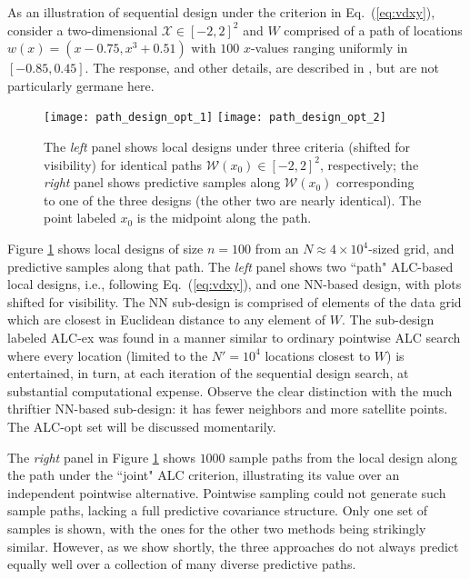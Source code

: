 \documentclass[12pt]{article}
\begin{document}
As an illustration of sequential design under the criterion in
Eq.~(\ref{eq:vdxy}), consider a two-dimensional $\mathcal{X} \in [-2,2]^2$ and $W$
comprised of a path of locations $w(x) = (x-0.75, x^3 + 0.51)$ with $100$
$x$-values ranging uniformly in $[-0.85, 0.45]$.  The response, and other
details, are described in \citet[][Section 3.4]{gramacy:apley:2015}, but are
not particularly germane here.  
\begin{figure}[ht!]
\centering
\texttt{[image: path\_design\_opt\_1]}\hspace{0.1cm}
\texttt{[image: path\_design\_opt\_2]}\vspace{-0.4cm}
\caption{
The {\em left} panel shows local designs under three criteria (shifted for
visibility) for identical paths $\mathcal{W}(x_0) \in [-2, 2]^2$,
respectively; the {\em right} panel shows predictive samples along
$\mathcal{W}(x_0)$ corresponding to one of the three designs (the other two
are nearly identical).  The point labeled $x_0$ is the midpoint along the
path.}
\label{f:path_design_opt}
\end{figure}
Figure \ref{f:path_design_opt} shows local designs of size $n=100$ from an
$N \approx 4 \times 10^4$-sized grid, and predictive samples along that path. The {\em
left} panel shows two ``path" ALC-based local designs, i.e., following
Eq.~(\ref{eq:vdxy}), and one NN-based design, with plots shifted for visibility.
The NN sub-design is comprised of elements of the data grid which are closest
in Euclidean distance
to any element of $W$. The sub-design labeled ALC-ex was found in a manner
similar to ordinary pointwise ALC search where every location (limited to the
$N'=10^4$ locations closest to $W$)
is entertained, in turn, at each iteration of the sequential design search, at
substantial computational expense. Observe the clear distinction with the much
thriftier NN-based sub-design:  it has fewer neighbors and more satellite
points. The ALC-opt set will be discussed momentarily.

The {\em right} panel in Figure \ref{f:path_design_opt} shows $1000$
sample paths from the local design along the path under the ``joint" ALC
criterion, illustrating its value over an independent pointwise alternative.
Pointwise sampling could not generate such sample paths, lacking a full
predictive covariance structure. Only one set of samples is shown, with the ones
for the other two methods being strikingly similar.  However, as we show
shortly, the three approaches do not always predict equally well over a
collection of many diverse predictive paths.
\end{document}
